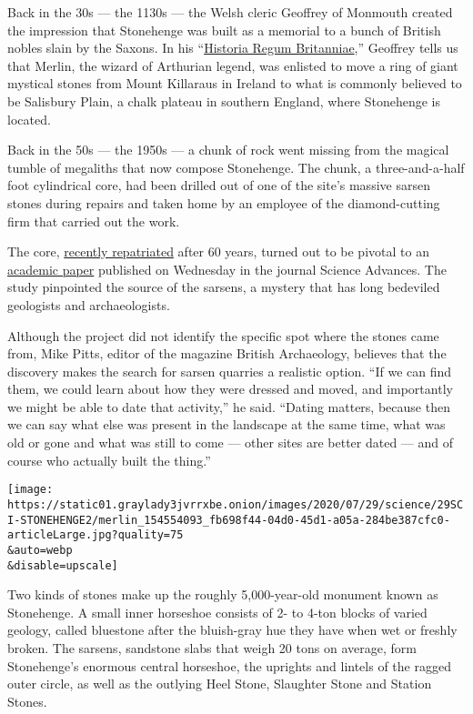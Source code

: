 Back in the 30s --- the 1130s --- the Welsh cleric Geoffrey of Monmouth
created the impression that Stonehenge was built as a memorial to a
bunch of British nobles slain by the Saxons. In his
``\href{https://en.wikipedia.org/wiki/Historia_Regum_Britanniae}{Historia
Regum Britanniae},'' Geoffrey tells us that Merlin, the wizard of
Arthurian legend, was enlisted to move a ring of giant mystical stones
from Mount Killaraus in Ireland to what is commonly believed to be
Salisbury Plain, a chalk plateau in southern England, where Stonehenge
is located.

Back in the 50s --- the 1950s --- a chunk of rock went missing from the
magical tumble of megaliths that now compose Stonehenge. The chunk, a
three-and-a-half foot cylindrical core, had been drilled out of one of
the site's massive sarsen stones during repairs and taken home by an
employee of the diamond-cutting firm that carried out the work.

The core,
\href{https://www.nytimes3xbfgragh.onion/2019/05/08/world/europe/uk-stonehenge-missing-piece.html}{recently
repatriated} after 60 years, turned out to be pivotal to an
\href{https://advances.sciencemag.org/content/6/31/eabc0133}{academic
paper} published on Wednesday in the journal Science Advances. The study
pinpointed the source of the sarsens, a mystery that has long bedeviled
geologists and archaeologists.

Although the project did not identify the specific spot where the stones
came from, Mike Pitts, editor of the magazine British Archaeology,
believes that the discovery makes the search for sarsen quarries a
realistic option. ``If we can find them, we could learn about how they
were dressed and moved, and importantly we might be able to date that
activity,'' he said. ``Dating matters, because then we can say what else
was present in the landscape at the same time, what was old or gone and
what was still to come --- other sites are better dated --- and of
course who actually built the thing.''

\texttt{[image: https://static01.graylady3jvrrxbe.onion/images/2020/07/29/science/29SCI-STONEHENGE2/merlin\_154554093\_fb698f44-04d0-45d1-a05a-284be387cfc0-articleLarge.jpg?quality=75\\\&auto=webp\\\&disable=upscale]}

Two kinds of stones make up the roughly 5,000-year-old monument known as
Stonehenge. A small inner horseshoe consists of 2- to 4-ton blocks of
varied geology, called bluestone after the bluish-gray hue they have
when wet or freshly broken. The sarsens, sandstone slabs that weigh 20
tons on average, form Stonehenge's enormous central horseshoe, the
uprights and lintels of the ragged outer circle, as well as the outlying
Heel Stone, Slaughter Stone and Station Stones.

